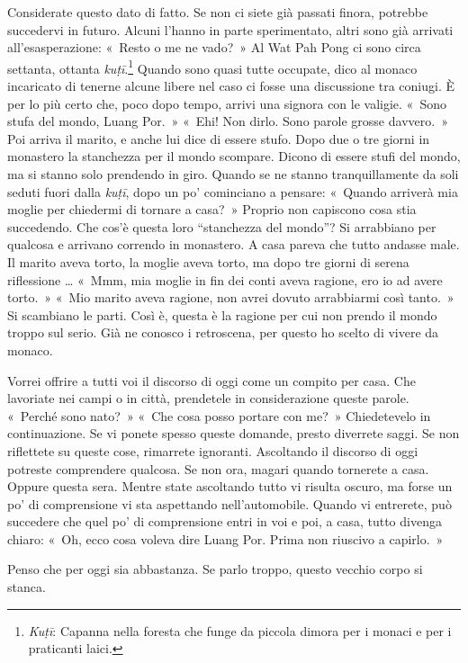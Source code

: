 \enlargethispage{-\baselineskip}

Considerate questo dato di fatto. Se non ci siete già passati finora,
potrebbe succedervi in futuro. Alcuni l'hanno in parte sperimentato,
altri sono già arrivati all'esasperazione: «~Resto o me ne vado?~» Al
Wat Pah Pong ci sono circa settanta, ottanta \emph{kuṭī}.\footnote{\emph{Kuṭī}:
  Capanna nella foresta che funge da piccola dimora per i monaci e per i
  praticanti laici.} Quando sono quasi tutte occupate, dico al monaco
incaricato di tenerne alcune libere nel caso ci fosse una discussione
tra coniugi. È per lo più certo che, poco dopo tempo, arrivi una signora
con le valigie. «~Sono stufa del mondo, Luang Por.~» «~Ehi! Non dirlo.
Sono parole grosse davvero.~» Poi arriva il marito, e anche lui dice di
essere stufo. Dopo due o tre giorni in monastero la stanchezza per il
mondo scompare. Dicono di essere stufi del mondo, ma si stanno solo
prendendo in giro. Quando se ne stanno tranquillamente da soli seduti
fuori dalla \emph{kuṭī}, dopo un po' cominciano a pensare: «~Quando
arriverà mia moglie per chiedermi di tornare a casa?~» Proprio non
capiscono cosa stia succedendo. Che cos'è questa loro ``stanchezza del
mondo''? Si arrabbiano per qualcosa e arrivano correndo in monastero. A
casa pareva che tutto andasse male. Il marito aveva torto, la moglie
aveva torto, ma dopo tre giorni di serena riflessione \ldots{} «~Mmm, mia
moglie in fin dei conti aveva ragione, ero io ad avere torto.~» «~Mio
marito aveva ragione, non avrei dovuto arrabbiarmi così tanto.~» Si
scambiano le parti. Così è, questa è la ragione per cui non prendo il
mondo troppo sul serio. Già ne conosco i retroscena, per questo ho
scelto di vivere da monaco.

Vorrei offrire a tutti voi il discorso di oggi come un compito per casa.
Che lavoriate nei campi o in città, prendetele in considerazione queste
parole. «~Perché sono nato?~» «~Che cosa posso portare con me?~»
Chiedetevelo in continuazione. Se vi ponete spesso queste domande,
presto diverrete saggi. Se non riflettete su queste cose, rimarrete
ignoranti. Ascoltando il discorso di oggi potreste comprendere qualcosa.
Se non ora, magari quando tornerete a casa. Oppure questa sera. Mentre
state ascoltando tutto vi risulta oscuro, ma forse un po' di
comprensione vi sta aspettando nell'automobile. Quando vi entrerete, può
succedere che quel po' di comprensione entri in voi e poi, a casa, tutto
divenga chiaro: «~Oh, ecco cosa voleva dire Luang Por. Prima non
riuscivo a capirlo.~»

Penso che per oggi sia abbastanza. Se parlo troppo, questo vecchio corpo
si stanca.

